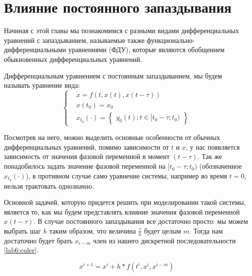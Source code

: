 \chapter{Влияние постоянного запаздывания}\label{lab6}

Начиная с этой главы мы познакомимся с разными видами
дифференциальных уравнений с запаздыванием, называемые
также функционально-дифференциальными уравнениями (ФДУ),
которые являются обобщением обыкновенных дифференциальных
уравнений.

\begin{definition}
    Дифференциальным уравнением с постоянным запаздыванием,
    мы будем называть уравнение вида:
    \begin{equation*}
        \begin{cases}
            &\dot{x} = f(t, x(t), x(t - \tau)) \\
            &x(t_0) = x_0 \\
            &x_{t_0}(\cdot) = \begin{Bmatrix}y_0(t); t \in [t_0 -\tau; t_0)\end{Bmatrix}
        \end{cases}
    \end{equation*}
\end{definition}

Посмотрев на него, можно выделить основные особенности от обычных дифференциальных
уравнений, помимо зависимости от $t$ и $x$, у нас появляется зависимость от
значения фазовой переменной в момент $(t-\tau)$. Так же
понадобилось задать значение фазовой переменной на $[t_0 -\tau; t_0)$
(обозначенное $x_{t_0}(\cdot)$),
в противном случае само уравнение системы, например во время $t=0$,
нельзя трактовать однозначно.

Основной задачей, которую придется решить при моделировании
такой системы, является то, как мы будем представлять
влияние значения фазовой переменной $x(t-\tau)$. В случае
постоянного запаздывания все достаточно просто:
мы можем выбрать шаг $h$ таким образом, что величина
$\frac{\tau}{h}$ будет целым $m$. Тогда нам достаточно будет
брать $x_{i-m}$ член из нашего дискретной последовательности
\eqref{lab6:euler}.

\begin{equation}\label{lab6:euler}
    x^{i+1} = x^i + h*f(t^i, x^i, x^{i-m})
\end{equation}

